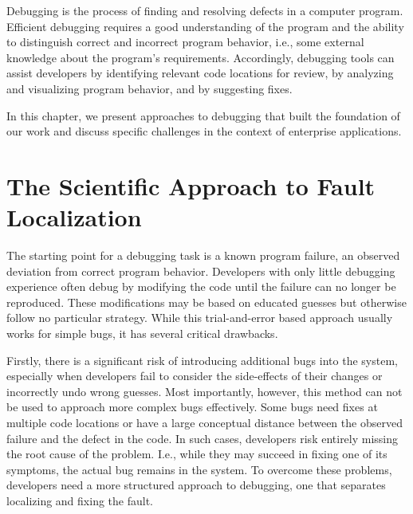 Debugging is the process of finding and resolving defects in a computer program.
Efficient debugging requires a good understanding of the program and the ability to distinguish correct and incorrect program behavior, i.e., some external knowledge about the program's requirements.
Accordingly, debugging tools can assist developers by identifying relevant code locations for review, by analyzing and visualizing program behavior, and by suggesting fixes.

In this chapter, we present approaches to debugging that built the foundation of our work and discuss specific challenges in the context of enterprise applications.

\section{The Scientific Approach to Fault Localization}

The starting point for a debugging task is a known program failure, an observed deviation from correct program behavior.
Developers with only little debugging experience often debug by modifying the code until the failure can no longer be reproduced.
These modifications may be based on educated guesses but otherwise follow no particular strategy.
While this trial-and-error based approach usually works for simple bugs, it has several critical drawbacks.

Firstly, there is a significant risk of introducing additional bugs into the system, especially when developers fail to consider the side-effects of their changes or incorrectly undo wrong guesses.
Most importantly, however, this method can not be used to approach more complex bugs effectively.
Some bugs need fixes at multiple code locations or have a large conceptual distance between the observed failure and the defect in the code.
In such cases, developers risk entirely missing the root cause of the problem.
I.e., while they may succeed in fixing one of its symptoms, the actual bug remains in the system.
To overcome these problems, developers need a more structured approach to debugging, one that separates localizing and fixing the fault.

